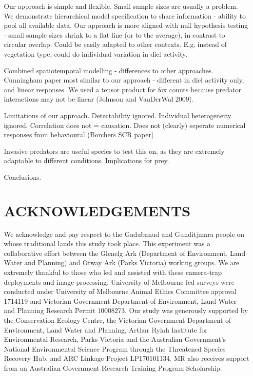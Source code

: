 \documentclass[]{elsarticle} %
\begin{document}
Our approach is simple and flexible.
Small sample sizes are usually a problem. We demonstrate hierarchical model specification to share information - ability to pool all available data.
Our approach is more aligned with null hypothesis testing - small sample sizes shrink to a flat line (or to the average), in contrast to circular overlap.
Could be easily adapted to other contexts. E.g. instead of vegetation type, could do individual variation in diel activity.

Combined spatiotemporal modelling - differences to other approaches.
Cunningham paper most similar to our approach - different in diel activity only, and linear responses.
We used a tensor product for fox counts because predator interactions may not be linear (Johnson and VanDerWal 2009).

Limitations of our approach.
Detectability ignored.
Individual heterogeneity ignored.
Correlation does not = causation.
Does not (clearly) seperate numerical responses from behavioural (Borchers SCR paper)

Invasive predators are useful species to test this on, as they are extremely adaptable to different conditions.
Implications for prey.

Conclusions.

\newpage

\hypertarget{acknowledgements}{%
\section{ACKNOWLEDGEMENTS}\label{acknowledgements}}

We acknowledge and pay respect to the Gadubanud and Gunditjmara people on whose traditional lands this study took place. This experiment was a collaborative effort between the Glenelg Ark (Department of Environment, Land Water and Planning) and Otway Ark (Parks Victoria) working groups. We are extremely thankful to those who led and assisted with these camera-trap deployments and image processing. University of Melbourne led surveys were conducted under University of Melbourne Animal Ethics Committee approval 1714119 and Victorian Government Department of Environment, Land Water and Planning Research Permit 10008273. Our study was generously supported by the Conservation Ecology Centre, the Victorian Government Department of Environment, Land Water and Planning, Arthur Rylah Institute for Environmental Research, Parks Victoria and the Australian Government's National Environmental Science Program through the Threatened Species Recovery Hub, and ARC Linkage Project LP170101134. MR also receives support from an Australian Government Research Training Program Scholarship.
\end{document}

